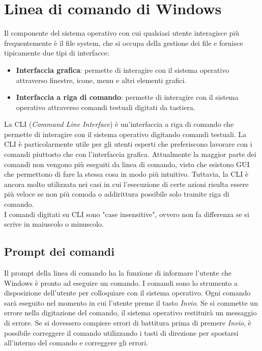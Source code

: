\documentclass[12pt]{report}
\begin{document}
	\chapter{Linea di comando di Windows}
	Il componente del sistema operativo con cui qualsiasi utente interagisce più frequentemente è il file system, che si occupa della gestione dei file e fornisce tipicamente due tipi di interfacce:
	\begin{itemize}
		\item \textbf{Interfaccia grafica}: permette di interagire con il sistema operativo attraverso finestre, icone, menu e altri elementi grafici.
		\item \textbf{Interfaccia a riga di comando}: permette di interagire con il sistema operativo attraverso comandi testuali digitati da tastiera.
	\end{itemize}
	La CLI (\textit{Command Line Interface}) è un'interfaccia a riga di comando che permette di interagire con il sistema operativo digitando comandi testuali. La CLI è particolarmente utile per gli utenti esperti che preferiscono lavorare con i comandi piuttosto che con l'interfaccia grafica. Attualmente la maggior parte dei comandi non vengono più eseguiti da linea di comando, visto che esistono GUI che permettono di fare la stessa cosa in modo più intuitivo. Tuttavia, la CLI è ancora molto utilizzata nei casi in cui l'esecuzione di certe azioni risulta essere più veloce se non più comoda o addirittura possibile solo tramite riga di comando.
	\vspace{\baselineskip}\\
	I comandi digitati su CLI sono "case insensitive", ovvero non fa differenza se si scrive in maiuscolo o minuscolo.

	\section{Prompt dei comandi}
	Il prompt della linea di comando ha la funzione di informare l'utente che Windows è pronto ad eseguire un comando. I comandi sono lo strumento a disposizione dell'utente per colloquiare con il sistema operativo. Ogni comando sarà eseguito nel momento in cui l'utente preme il tasto \textit{Invio}. Se si commette un errore nella digitazione del comando, il sistema operativo restituirà un messaggio di errore. Se si dovessero compiere errori di battitura prima di premere \textit{Invio}, è possibile correggere il comando utilizzando i tasti di direzione per spostarsi all'interno del comando e correggere gli errori.
\end{document}
